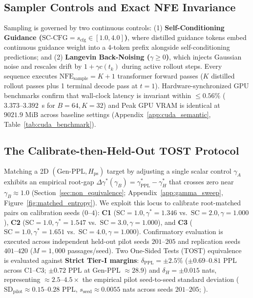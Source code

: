 \documentclass[11pt,a4paper]{article}
\begin{document}
\subsection{Sampler Controls and Exact NFE Invariance}
Sampling is governed by two continuous controls: (1) \textbf{Self-Conditioning Guidance ($\text{SC-CFG} = s_{\mathrm{cfg}} \in [1.0, 4.0]$)}, where distilled guidance tokens embed continuous guidance weight into a 4-token prefix alongside self-conditioning predictions; and (2) \textbf{Langevin Back-Noising ($\gamma \ge 0$)}, which injects Gaussian noise and rescales drift by $1 + \gamma c(t_k)$ during active rollout steps. Every sequence executes $\text{NFE}_{\mathrm{sample}} = K+1$ transformer forward passes ($K$ distilled rollout passes plus 1 terminal decode pass at $t=1$). Hardware-synchronized GPU benchmarks confirm that wall-clock latency is invariant within $\le 0.56\%$ ($3.373\text{--}3.392$~s for $B=64, K=32$) and Peak GPU VRAM is identical at $9021.9\text{ MiB}$ across baseline settings (Appendix~\ref{app:cuda_semantic}, Table~\ref{tab:cuda_benchmark}).

\subsection{The Calibrate-then-Held-Out TOST Protocol}
Matching a 2D $(\text{Gen-PPL}, H_{\mathrm{ps}})$ target by adjusting a single scalar control $\gamma_A$ exhibits an empirical root-gap $\Delta\gamma^*(\gamma_B) = \gamma_{\mathrm{PPL}}^* - \gamma_H^*$ that crosses zero near $\gamma_B \approx 1.0$ (Section~\ref{sec:non_equivalence}; Appendix~\ref{app:gamma_sweep}, Figure~\ref{fig:matched_entropy}). We exploit this locus to calibrate root-matched pairs on calibration seeds ($0\text{--}4$):
\textbf{C1} ($\text{SC}=1.0, \gamma^*=1.346$ vs.\ $\text{SC}=2.0, \gamma=1.000$),
\textbf{C2} ($\text{SC}=1.0, \gamma^*=1.547$ vs.\ $\text{SC}=3.0, \gamma=1.000$), and
\textbf{C3} ($\text{SC}=1.0, \gamma^*=1.651$ vs.\ $\text{SC}=4.0, \gamma=1.000$).
Confirmatory evaluation is executed across independent held-out pilot seeds $201\text{--}205$ and replication seeds $401\text{--}420$ ($M=1{,}000$ passages/seed). Two One-Sided Tests (TOST) equivalence~\citep{schuirmann1987comparison} is evaluated against \textbf{Strict Tier-I margins}: $\delta_{\mathrm{PPL}} = \pm 2.5\%$ ($\pm 0.69\text{--}0.81$ PPL across C1--C3; $\pm 0.72$ PPL at Gen-PPL $\approx 28.9$) and $\delta_H = \pm 0.015$ nats, representing $\approx 2.5\text{--}4.5\times$ the empirical pilot seed-to-seed standard deviation ($\mathrm{SD}_{\mathrm{pilot}} \approx 0.15\text{--}0.28$ PPL, $s_{\mathrm{seed}} \approx 0.0055$ nats across seeds $201\text{--}205$; ).
\end{document}
